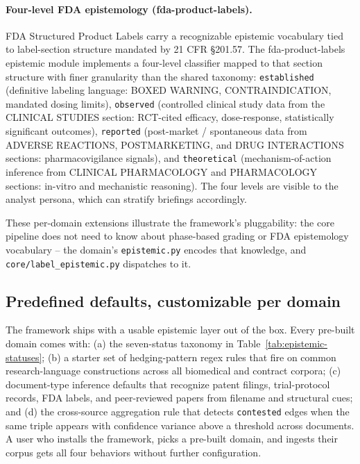 \paragraph{Four-level FDA epistemology (fda-product-labels).} FDA Structured Product Labels carry a recognizable epistemic vocabulary tied to label-section structure mandated by 21 CFR §201.57. The fda-product-labels epistemic module implements a four-level classifier mapped to that section structure with finer granularity than the shared taxonomy: \texttt{established} (definitive labeling language: BOXED WARNING, CONTRAINDICATION, mandated dosing limits), \texttt{observed} (controlled clinical study data from the CLINICAL STUDIES section: RCT-cited efficacy, dose-response, statistically significant outcomes), \texttt{reported} (post-market / spontaneous data from ADVERSE REACTIONS, POSTMARKETING, and DRUG INTERACTIONS sections: pharmacovigilance signals), and \texttt{theoretical} (mechanism-of-action inference from CLINICAL PHARMACOLOGY and PHARMACOLOGY sections: in-vitro and mechanistic reasoning). The four levels are visible to the analyst persona, which can stratify briefings accordingly.

These per-domain extensions illustrate the framework's pluggability: the core pipeline does not need to know about phase-based grading or FDA epistemology vocabulary -- the domain's \texttt{epistemic.py} encodes that knowledge, and \texttt{core/label\_epistemic.py} dispatches to it.

\subsection{Predefined defaults, customizable per domain}
\label{sec:epistemic-customization}

The framework ships with a usable epistemic layer out of the box. Every pre-built domain comes with: (a) the seven-status taxonomy in Table~\ref{tab:epistemic-statuses}; (b) a starter set of hedging-pattern regex rules that fire on common research-language constructions across all biomedical and contract corpora; (c) document-type inference defaults that recognize patent filings, trial-protocol records, FDA labels, and peer-reviewed papers from filename and structural cues; and (d) the cross-source aggregation rule that detects \texttt{contested} edges when the same triple appears with confidence variance above a threshold across documents. A user who installs the framework, picks a pre-built domain, and ingests their corpus gets all four behaviors without further configuration.

